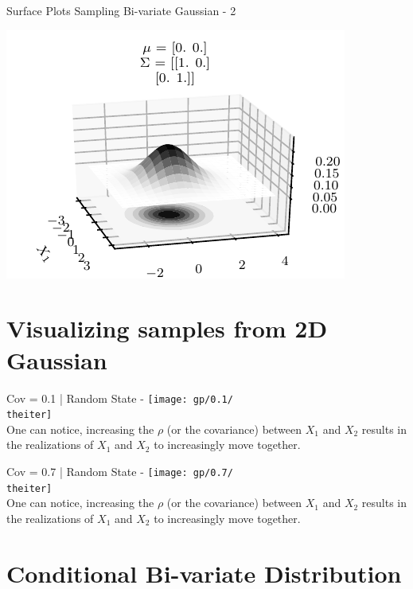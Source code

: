 \documentclass{beamer}
\begin{document}
	\begin{frame}{Surface Plots Sampling Bi-variate Gaussian - 2}
		\begin{center}
			\includegraphics[height=\textheight -10pt ,keepaspectratio]{gp/2dgp3d2}
		\end{center}
	\end{frame}
	
	\section{Visualizing samples from 2D Gaussian}
	
	{%
		\begin{frame}{Cov = 0.1 | Random State - \theiter}
			\texttt{[image: gp/0.1/\\theiter]}\\
			One can notice, increasing the $\rho$ (or the covariance) between $X_1$ and $X_2$ results in the realizations of $X_1$ and $X_2$ to increasingly move together.
		\end{frame}
	}
	{%
		\begin{frame}{Cov = 0.7 | Random State - \theiter}
			\texttt{[image: gp/0.7/\\theiter]}\\
			One can notice, increasing the $\rho$ (or the covariance) between $X_1$ and $X_2$ results in the realizations of $X_1$ and $X_2$ to increasingly move together.
		\end{frame}
	}
	
	\section{Conditional Bi-variate Distribution}
	
\end{document}
